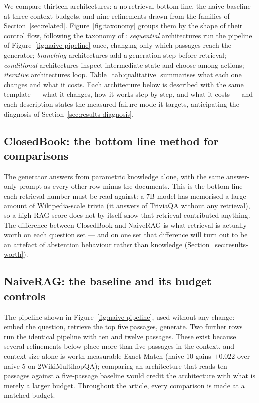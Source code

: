 We compare thirteen architectures: a no-retrieval bottom line, the naive
baseline at three context budgets, and nine refinements drawn from the
families of Section~\ref{sec:related}. Figure~\ref{fig:taxonomy} groups
them by the shape of their control flow, following the taxonomy of
\citet{jin2024flashrag}: \emph{sequential} architectures run the pipeline of
Figure~\ref{fig:naive-pipeline} once, changing only which passages reach
the generator; \emph{branching} architectures add a generation step before
retrieval; \emph{conditional} architectures inspect intermediate state and
choose among actions; \emph{iterative} architectures loop.
Table~\ref{tab:qualitative} summarises what each one changes and what it
costs. Each architecture below is described with the same template ---
what it changes, how it works step by step, and what it costs --- and each
description states the measured failure mode it targets, anticipating the
diagnosis of Section~\ref{sec:results-diagnosis}.

\subsection{ClosedBook: the bottom line method for comparisons}
\label{sec:arch-closedbook}

The generator answers from parametric knowledge alone, with the same
answer-only prompt as every other row minus the documents. This is the
bottom line each retrieval number must be read against: a 7B model has memorised
a large amount of Wikipedia-scale trivia (it answers
\ClosedBookTriviaQAEM{} of TriviaQA without any retrieval), so a high RAG
score does not by itself show that retrieval contributed anything. The
difference between ClosedBook and NaiveRAG is what retrieval is actually
worth on each question set --- and on one set that difference will turn
out to be an artefact of abstention behaviour rather than knowledge
(Section~\ref{sec:results-worth}).

\subsection{NaiveRAG: the baseline and its budget controls}
\label{sec:arch-naive}

The pipeline shown in Figure~\ref{fig:naive-pipeline}, used without any
change: embed the question, retrieve the top five passages, generate. Two further rows run
the identical pipeline with ten and twelve passages. These exist because
several refinements below place more than five passages in the context, and
context size alone is worth measurable Exact Match (naive-10 gains $+0.022$
over naive-5 on 2WikiMultihopQA); comparing an architecture that reads ten
passages against a five-passage baseline would credit the architecture with
what is merely a larger budget. Throughout the article, every comparison
is made at a matched budget.

